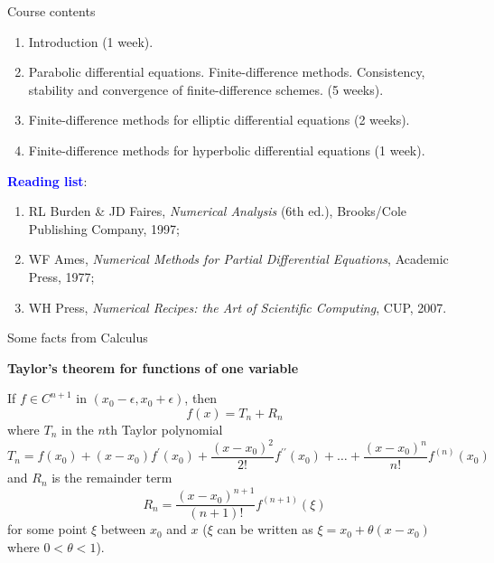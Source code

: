 \documentclass{beamer}
\begin{document}

\begin{frame}{Course contents}

{\footnotesize

\begin{enumerate}

\item{} Introduction (1 week).

\item{} Parabolic differential equations. Finite-difference methods. Consistency, stability and convergence of
finite-difference schemes. (5 weeks).

\item{} Finite-difference methods for elliptic differential equations (2 weeks).

\item{} Finite-difference methods for hyperbolic differential equations (1 week).

\end{enumerate}

\vskip 5mm
\pause

\textcolor{blue}{\textbf{Reading list}}:

\begin{enumerate}

\item{} RL Burden \& JD Faires, {\it Numerical Analysis}
(6th ed.), Brooks/Cole Publishing Company, 1997;

\item{} WF Ames,
{\it Numerical Methods for Partial Differential Equations}, Academic
Press, 1977;

\item{} WH Press,
{\it Numerical Recipes: the Art of Scientific Computing}, CUP, 2007.

\end{enumerate}
}

\end{frame}






\begin{frame}{\small Some facts from Calculus}

{\footnotesize

\textbf{Taylor's theorem for functions of one variable}

\vskip 3mm
If $f\in C^{n+1}$ in $(x_{0}-\epsilon,x_{0}+\epsilon)$, then
\[
f(x)=T_{n}+R_{n}
\]
where $T_{n}$ in the $n$th Taylor polynomial
\[
T_{n}=f(x_{0})+(x-x_{0})f^{\prime}(x_{0})+
\frac{(x-x_{0})^{2}}{2!}f^{\prime\prime}(x_{0})+ \dots+
\frac{(x-x_{0})^{n}}{n!}f^{(n)}(x_{0})
\]
and $R_{n}$ is the remainder term
\[
R_{n}=\frac{(x-x_{0})^{n+1}}{(n+1)!}f^{(n+1)}(\xi)
\]
for some point $\xi$ between $x_{0}$ and $x$ ($\xi$ can be written
as $\xi=x_{0}+\theta (x-x_{0})$ where $0< \theta<1$).

}

\end{frame}
\end{document}
